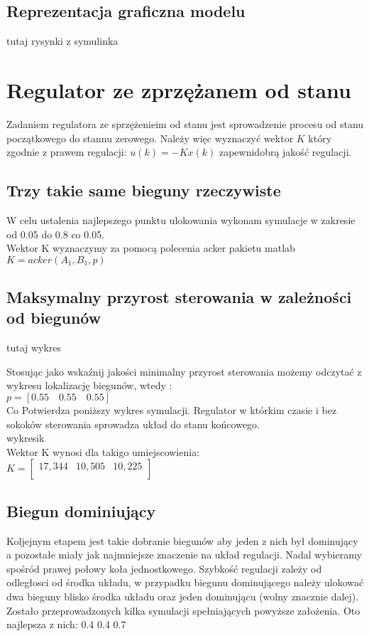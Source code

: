 \documentclass[a4paper, 11pt]{article}
\begin{document}
\subsection{Reprezentacja graficzna modelu}
tutaj rysynki z symulinka 

\section{Regulator ze zprzężanem od stanu}
Zadaniem regulatora ze sprzężenieim od stanu jest sprowadzenie procesu od stanu początkowego do stannu zerowego. Należy więc wyznaczyć wektor $K$ który zgodnie z prawem regulacji: $u(k) = -Kx(k)$ zapewnidobrą jakość regulacji. 
\subsection{Trzy takie same bieguny rzeczywiste}
W celu ustalenia najlepszego punktu ulokowania wykonam symulacje w zakresie od 0.05 do 0.8 co 0.05. \\

\noindent Wektor K wyznaczymy za pomocą polecenia acker pakietu matlab\\

$K = acker(A_1,B_1,p)$\\

\subsection{Maksymalny przyrost sterowania w zależności od biegunów} 
tutaj wykres


Stosując jako wskaźnij jakości minimalny przyrost sterowania możemy odczytać z wykresu lokalizację biegunów, wtedy :\\
$p = [0.55\quad0.55\quad 0.55]$\\
Co Potwierdza poniższy wykres symulacji. Regulator w którkim czasie i bez sokoków sterowania sprowadza układ do stanu końcowego. 
\\
wykresik 
\\
\noindent Wektor K wynosi dla takigo umiejscowienia:\\

$K= \left[
        \begin{array}{ccc}
         17,344&10,505&10,225\\
         \end{array}
      \right]$


\subsection{Biegun dominiujący}
Koljejnym etapem jest takie dobranie biegunów aby jeden z nich był dominujący a pozostałe miały jak najmniejsze znaczenie na układ regulacji. Nadal wybieramy spośród prawej połowy koła jednostkowego. Szybkość regulacji zależy od odległosci od środka układu, w przypadku biegunu dominującego należy ulokować dwa bieguny blisko środka układu oraz jeden dominującu (wolny znacznie dalej). Zostało przeprowadzonych kilka symulacji spełniających powyższe założenia. Oto najlepsza z nich: 0.4 0.4 0.7
\end{document}

